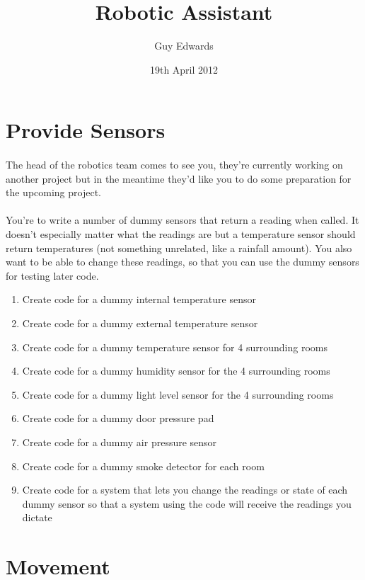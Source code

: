 \documentclass[11pt]{book}
\title{\textbf{Robotic Assistant}}
\author{Guy Edwards}
\date{19th April 2012}
\begin{document}

\section{Provide Sensors}

\paragraph{} The head of the robotics team comes to see you, they're currently working on another project but in the meantime they'd like you to do some preparation for the upcoming project.

\paragraph{} You're to write a number of dummy sensors that return a reading when called. It doesn't especially matter what the readings are but a temperature sensor should return temperatures (not something unrelated, like a rainfall amount). You also want to be able to change these readings, so that you can use the dummy sensors for testing later code.

\begin{enumerate}
\item Create code for a dummy internal temperature sensor
\item Create code for a dummy external temperature sensor
\item Create code for a dummy temperature sensor for 4 surrounding rooms
\item Create code for a dummy humidity sensor for the 4 surrounding rooms
\item Create code for a dummy light level sensor for the 4 surrounding rooms
\item Create code for a dummy door pressure pad
\item Create code for a dummy air pressure sensor
\item Create code for a dummy smoke detector for each room
\item Create code for a system that lets you change the readings or state of each dummy sensor so that a system using the code will receive the readings you dictate
\end{enumerate}

\clearpage

\section{Movement}
\end{document}
